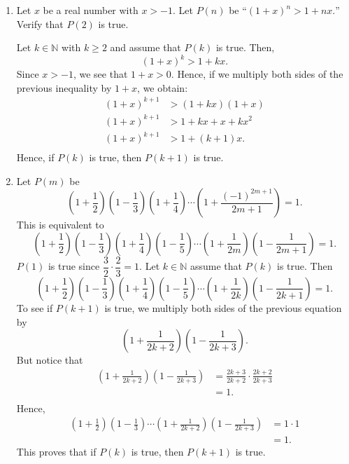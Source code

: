 \begin{enumerate}
\item Let $x$ be a real number with $x > -1$.  Let $P \left( n \right)$ be 
``$\left( 1 + x \right)^n > 1 + nx.$''  Verify that $P \left( 2 \right)$ is true.

Let $k \in \mathbb{N}$ with $k \geq 2$ and assume that $P \left( k \right)$ is true.  Then,
\[
\left( 1 + x \right)^k > 1 + kx.
\]
Since $x > -1$, we see that $1 + x > 0$.  Hence, if we multiply both sides of the previous inequality by $1 + x$, we obtain:
\[
\begin{aligned}
\left( 1 + x \right)^{k+1} &> \left( 1 + kx \right) \left( 1 + x \right) \\
\left( 1 + x \right)^{k+1} &> 1 + kx + x + kx^2 \\
\left( 1 + x \right)^{k+1} &> 1 + \left(k + 1 \right) x. \\
\end{aligned}
\]
Hence, if $P \left( k \right)$ is true, then $P \left( k + 1 \right)$ is true.



\item Let $P \left( m \right)$ be
\[
\left( {1 + \frac{1}{2}} \right)
\left( {1 - \frac{1}{3}} \right)
\left( {1 + \frac{1}{4}} \right) 
\cdots 
\left( {1 + \frac{{\left( { - 1} \right)^{2m+1} }}{2m+1}} \right) = 1.
\]
This is equivalent to
\[
\left( {1 + \frac{1}{2}} \right)
\left( {1 - \frac{1}{3}} \right)
\left( {1 + \frac{1}{4}} \right)
\left( {1 - \frac{1}{5}} \right) 
\cdots 
\left( 1 + \frac{1}{2m} \right) \left( {1 - \frac{1}{2m+1}} \right) = 1.
\]
$P \left( 1 \right)$ is true since $\dfrac{3}{2} \cdot \dfrac{2}{3} = 1$.  Let $k \in \mathbb{N}$ assume that $P \left( k \right)$ is true.  Then
\[
\left( {1 + \frac{1}{2}} \right)
\left( {1 - \frac{1}{3}} \right)
\left( {1 + \frac{1}{4}} \right)
\left( {1 - \frac{1}{5}} \right) 
\cdots 
\left( 1 + \frac{1}{2k} \right) \left( {1 - \frac{1}{2k+1}} \right) = 1.
\]
To see if $P \left( k + 1 \right)$ is true, we multiply both sides of the previous equation by
\[
\left(1 + \frac{1}{2k+2} \right) \left( 1 - \frac{1}{2k+3} \right).
\]
But notice that
\[
\begin{aligned}
\left(1 + \frac{1}{2k+2} \right) \left( 1 - \frac{1}{2k+3} \right) &=
\frac{2k+3}{2k+2} \cdot \frac{2k+2}{2k+3} \\
&= 1. \\
\end{aligned}
\]
Hence,
\[
\begin{aligned}
\left( {1 + \frac{1}{2}} \right)
\left( {1 - \frac{1}{3}} \right)
\cdots 
\left(1 + \frac{1}{2k+2} \right) \left( 1 - \frac{1}{2k+3} \right) &= 1 \cdot 1 \\
 &= 1.
\end{aligned}
\]
This proves that if $P \left( k \right)$ is true, then $P \left( k + 1 \right)$ is true.




\end{enumerate}
